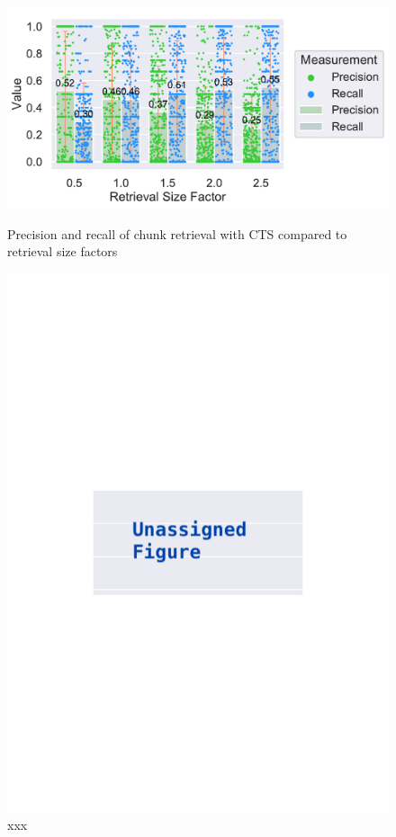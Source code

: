 \documentclass[\myrootdir/main.tex]{subfiles}
\begin{document}
\begin{figure}[htbp]
	\centering
	\begin{minipage}{0.45\textwidth}
		\centering
		\includegraphics[width=\textwidth, clip]{img/big-study/contextsizefactor-precision-recall-TS.pdf}
		\caption{Precision and recall of chunk retrieval with CTS compared to retrieval size factors}
		\label{fig:contextsizefactor-precision-recall-TS}
	\end{minipage}\hfill
	\begin{minipage}{0.45\textwidth}
		\centering
		\includegraphics[width=\textwidth, clip]{img/big-study/xxx.pdf}
		\caption{xxx}
		\label{fig:xxx}
	\end{minipage}
\end{figure}
\end{document}
